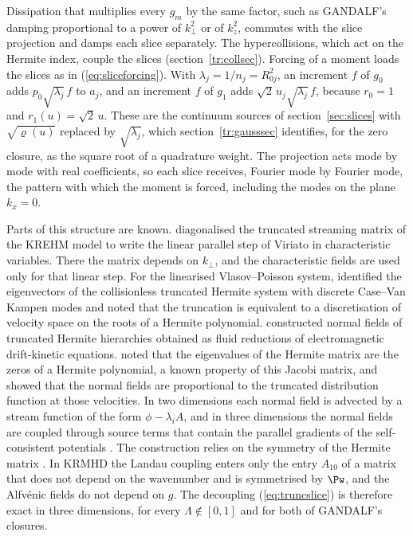 Dissipation that multiplies every $g_m$ by the same factor, such as GANDALF's damping proportional to a power of $k_\perp^2$ or of $k_z^2$, commutes with the slice projection and damps each slice separately. The hypercollisions, which act on the Hermite index, couple the slices (section~\ref{tr:collsec}). Forcing of a moment loads the slices as in (\ref{eq:sliceforcing}). With $\lambda_j=1/n_j=R_{0j}^2$, an increment $f$ of $g_0$ adds $p_0\sqrt{\lambda_j}\,f$ to $a_j$, and an increment $f$ of $g_1$ adds $\sqrt2\,u_j\sqrt{\lambda_j}\,f$, because $r_0=1$ and $r_1(u)=\sqrt2\,u$. These are the continuum sources of section~\ref{sec:slices} with $\sqrt{\varrho(u)}$ replaced by $\sqrt{\lambda_j}$, which section~\ref{tr:gausssec} identifies, for the zero closure, as the square root of a quadrature weight. The projection acts mode by mode with real coefficients, so each slice receives, Fourier mode by Fourier mode, the pattern with which the moment is forced, including the modes on the plane $k_x=0$.

Parts of this structure are known. \citet[\S6.2.1]{Loureiro2016} diagonalised the truncated streaming matrix of the KREHM model to write the linear parallel step of Viriato in characteristic variables. There the matrix depends on $k_\perp$, and the characteristic fields are used only for that linear step. For the linearised Vlasov--Poisson system, \citet{ParkerDellar2015} identified the eigenvectors of the collisionless truncated Hermite system with discrete Case--Van Kampen modes and noted that the truncation is equivalent to a discretisation of velocity space on the roots of a Hermite polynomial. \citet{Tassi2015} constructed normal fields of truncated Hermite hierarchies obtained as fluid reductions of electromagnetic drift-kinetic equations. \citet[\S7]{Tassi2022} noted that the eigenvalues of the Hermite matrix are the zeros of a Hermite polynomial, a known property of this Jacobi matrix, and showed that the normal fields are proportional to the truncated distribution function at those velocities. In two dimensions each normal field is advected by a stream function of the form $\phi-\lambda_iA$, and in three dimensions the normal fields are coupled through source terms that contain the parallel gradients of the self-consistent potentials \citep[\S7]{Tassi2022}. The construction relies on the symmetry of the Hermite matrix \citep{Tassi2015}. In KRMHD the Landau coupling enters only the entry $A_{10}$ of a matrix that does not depend on the wavenumber and is symmetrised by $\Pw$, and the Alfv\'enic fields do not depend on $g$. The decoupling (\ref{eq:truncslice}) is therefore exact in three dimensions, for every $\Lambda\notin[0,1]$ and for both of GANDALF's closures.

